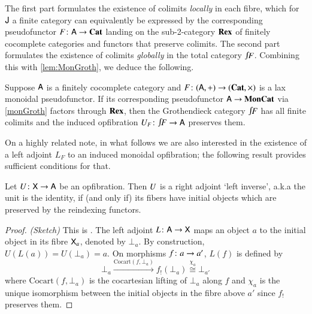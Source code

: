 \documentclass[reqno]{amsart}
\begin{document}
The first part formulates the existence of colimits \emph{locally} in each fibre, which for $\mathsf{J}$ a finite category can equivalently be expressed by the corresponding pseudofunctor $F\colon\mathsf{A}\to\mathbf{Cat}$ landing on the sub-2-category $\mathbf{Rex}$ of finitely cocomplete categories and functors that preserve colimits. The second part formulates the existence of colimits \emph{globally} in the total category $\inta F$. Combining this with \cref{lem:MonGroth}, we deduce the following.

\begin{cor}\label{cor:fcocMonGroth}
 Suppose $\mathsf{A}$ is a finitely cocomplete category and $F\colon(\mathsf{A},+)\to(\mathbf{Cat},\times)$ is a lax monoidal pseudofunctor. If its corresponding pseudofunctor $\mathsf{A}\to\mathbf{MonCat}$ via \cref{monGroth} 
 factors through $\mathbf{Rex}$, then the Grothendieck category $\inta F$ has all finite colimits and the induced opfibration $\U_F\maps\inta F\to\A$ preserves them. 
\end{cor}

On a highly related note, in what follows we are also interested in the existence of a left adjoint $L_F$ to an induced monoidal opfibration; the following result provides sufficient conditions for that.

\begin{lem}\label{prop:opfibtolari}
  Let $U \colon\mathsf{X} \to \mathsf{A}$ be an opfibration. Then
  $U$ is a right adjoint `left inverse', a.k.a the unit is the identity, if (and only if) its fibers have
  initial objects which are preserved by the
  reindexing functors.
\end{lem}

\begin{proof}\emph{(Sketch)}
 This is \cite[Proposition~4.4]{Gray}. The left adjoint $L\colon\mathsf{A}\to\mathsf{X}$ maps an object $a$ to the initial object in its fibre $\mathsf{X}_a$, denoted by $\bot_a$. By construction, $U(L(a))=U(\bot_a)=a$. On morphisms $f\colon a\to a'$, $L(f)$ is defined by
 \begin{equation}\label{eq:Lonarrows}
  \bot_a\xrightarrow{\mathrm{Cocart}(f,\bot_a)}f_!(\bot_a)\stackrel{\chi_a}{\cong}\bot_{a'}
 \end{equation}
where $\mathrm{Cocart}(f,\bot_a)$ is the cocartesian lifting of $\bot_a$ along $f$ and $\chi_a$ is the unique isomorphism between the initial objects in the fibre above $a'$ since $f_!$ preserves them.
\end{proof}
\end{document}
